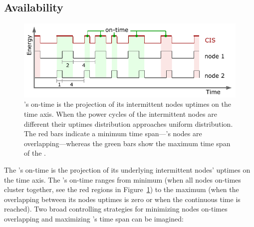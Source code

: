 \subsection{Availability}
\label{subSec:availability}
%
\begin{figure}[t]
		\centering
		\includegraphics[width=\columnwidth]{figures/cisOntime}
		\caption{\fullsys's on-time is the projection of its intermittent nodes uptimes on the time axis. When the power cycles of the intermittent nodes are different their uptimes distribution approaches uniform distribution. The red bars indicate a minimum \cim time span---\cim's nodes are overlapping---whereas the green bars show the maximum time span of the \cim.}
		\label{fig:cisOntime}
\end{figure} 
%
The \sys's on-time is the projection of its underlying intermittent nodes' uptimes on the time axis. The \sys's on-time ranges from minimum (when all nodes on-times cluster together, see the red regions in Figure~\ref{fig:cisOntime}) to the maximum (when the overlapping between its nodes uptimes is zero or when the continuous time is reached). Two broad controlling strategies for minimizing nodes on-times overlapping and maximizing \sys's time span can be imagined: 
